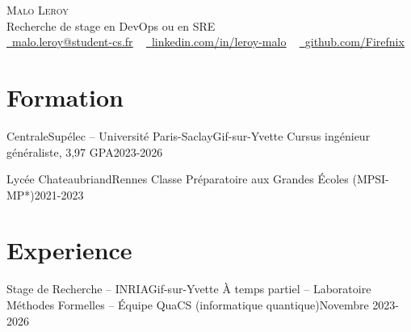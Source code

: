     \begin{center}
        {\Huge\scshape Malo Leroy} 
        \\ Recherche de stage en DevOps ou en SRE\\
        \small
        \href{mailto:EMAIL}{\raisebox{-0.2\height}\faEnvelope\  \underline{malo.leroy@student-cs.fr}} ~ 
        \href{LINK}{\raisebox{-0.2\height}\faLinkedin\ \underline{linkedin.com/in/leroy-malo}}  ~
        \href{LINK}{\raisebox{-0.2\height}\faGithub\ \underline{github.com/Firefnix}}
    \end{center}

\section{Formation}
  \resumeSubHeadingListStart
  
    \resumeSubheading
    {CentraleSupélec -- Université Paris-Saclay}{Gif-sur-Yvette}
    {Cursus ingénieur généraliste, 3,97 GPA}{2023-2026}
        \resumeItemListStart
        \resumeItemListEnd

    \resumeSubheading
    {Lycée Chateaubriand}{Rennes}
    {Classe Préparatoire aux Grandes Écoles (MPSI-MP*)}{2021-2023}

  \resumeSubHeadingListEnd


\section{Experience}
\resumeSubHeadingListStart
    \resumeSubheading
    {Stage de Recherche -- INRIA}{Gif-sur-Yvette}
        {À temps partiel -- Laboratoire Méthodes Formelles -- Équipe QuaCS (informatique quantique)}{Novembre 2023-2026}
        \resumeItemListStart
        \resumeItemListEnd

